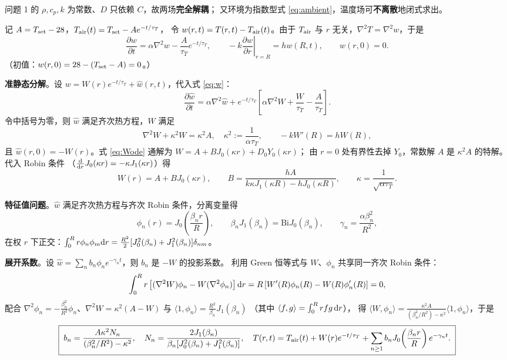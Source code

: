 \documentclass[withoutpreface,bwprint]{cumcmthesis}
\begin{document}
问题 1 的 $\rho,c_p,k$ 为常数、$D$ 只依赖 $C$，故两场\textbf{完全解耦}；
又环境为指数型式 \eqref{eq:ambient}，温度场可\textbf{不离散}地闭式求出。

记 $A=T_{\rm set}-28$，$T_{\rm air}(t)=T_{\rm set}-Ae^{-t/\tau_T}$，
令 $w(r,t)=T(r,t)-T_{\rm air}(t)$。由于 $T_{\rm air}$ 与 $r$ 无关，$\nabla^2T=\nabla^2w$，于是
\begin{equation}
\frac{\partial w}{\partial t}=\alpha\nabla^2w-\frac{A}{\tau_T}e^{-t/\tau_T},
\qquad
-k\left.\frac{\partial w}{\partial r}\right|_{r=R}=hw(R,t),
\qquad
w(r,0)=0 .
\label{eq:w}
\end{equation}
（初值：$w(r,0)=28-(T_{\rm set}-A)=0$。）

\textbf{准静态分解}。设 $w=W(r)e^{-t/\tau_T}+\hat w(r,t)$，代入式 \eqref{eq:w}：
\[
\frac{\partial\hat w}{\partial t}=\alpha\nabla^2\hat w
+e^{-t/\tau_T}\left[\alpha\nabla^2W+\frac{W}{\tau_T}-\frac{A}{\tau_T}\right].
\]
令中括号为零，则 $\hat w$ 满足齐次热方程，$W$ 满足
\begin{equation}
\nabla^2W+\kappa^2W=\kappa^2A,\quad \kappa^2:=\frac{1}{\alpha\tau_T},
\qquad
-kW'(R)=hW(R),
\label{eq:Wode}
\end{equation}
且 $\hat w(r,0)=-W(r)$。式 \eqref{eq:Wode} 通解为 $W=A+BJ_0(\kappa r)+D_0Y_0(\kappa r)$；
由 $r=0$ 处有界性去掉 $Y_0$，常数解 $A$ 是 $\kappa^2A$ 的特解。代入 Robin 条件
（$\frac{\rm d}{{\rm d}r}J_0(\kappa r)=-\kappa J_1(\kappa r)$）得
\begin{equation}
\boxed{\;W(r)=A+BJ_0(\kappa r),\qquad
B=\frac{hA}{k\kappa J_1(\kappa R)-hJ_0(\kappa R)},\qquad
\kappa=\frac{1}{\sqrt{\alpha\tau_T}}.\;}
\label{eq:W}
\end{equation}

\textbf{特征值问题}。$\hat w$ 满足齐次热方程与齐次 Robin 条件，分离变量得
\begin{equation}
\phi_n(r)=J_0\!\left(\frac{\beta_nr}{R}\right),
\qquad
\beta_nJ_1(\beta_n)=\mathrm{Bi}J_0(\beta_n),
\qquad
\gamma_n=\frac{\alpha\beta_n^2}{R^2},
\label{eq:eig}
\end{equation}
在权 $r$ 下正交：$\int_0^Rr\phi_n\phi_m{\rm d}r=\frac{R^2}{2}
[J_0^2(\beta_n)+J_1^2(\beta_n)]\delta_{nm}$。

\textbf{展开系数}。设 $\hat w=\sum_nb_n\phi_ne^{-\gamma_nt}$，则 $b_n$ 是 $-W$ 的投影系数。
利用 Green 恒等式与 $W$、$\phi_n$ 共享同一齐次 Robin 条件：
\[
\int_0^Rr\left[(\nabla^2W)\phi_n-W(\nabla^2\phi_n)\right]{\rm d}r
=R\left[W'(R)\phi_n(R)-W(R)\phi_n'(R)\right]=0,
\]
配合 $\nabla^2\phi_n=-\frac{\beta_n^2}{R^2}\phi_n$、$\nabla^2W=\kappa^2(A-W)$
与 $\langle1,\phi_n\rangle=\frac{R^2}{\beta_n}J_1(\beta_n)$
（其中 $\langle f,g\rangle=\int_0^Rrfg\,{\rm d}r$），
得 $\langle W,\phi_n\rangle=\frac{\kappa^2A}{(\beta_n^2/R^2)-\kappa^2}\langle1,\phi_n\rangle$，于是
\begin{equation}
\boxed{\;
b_n=\frac{A\kappa^2N_n}{(\beta_n^2/R^2)-\kappa^2},\quad
N_n=\frac{2J_1(\beta_n)}{\beta_n[J_0^2(\beta_n)+J_1^2(\beta_n)]},\quad
T(r,t)=T_{\rm air}(t)+W(r)e^{-t/\tau_T}+\sum_{n\ge1}b_nJ_0\!\left(\frac{\beta_nr}{R}\right)e^{-\gamma_nt}.
\;}
\label{eq:Tsol}
\end{equation}
\end{document}
